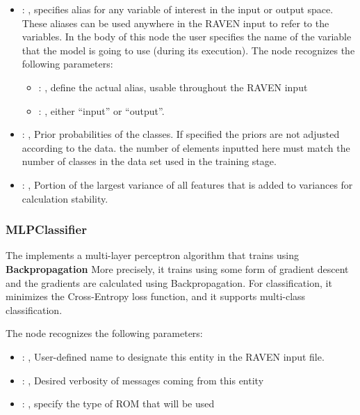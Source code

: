 \begin{itemize}
    \item {}: , 
      specifies alias for         any variable of interest in the input or output space. These
      aliases can be used anywhere in the RAVEN input to         refer to the variables. In the body
      of this node the user specifies the name of the variable that the model is going to use
      (during its execution).
      The  node recognizes the following parameters:
        \begin{itemize}
          \item {}: , 
            define the actual alias, usable throughout the RAVEN input
          \item {}: , 
            either ``input'' or ``output''.
      \end{itemize}

    \item {}: , 
      Prior probabilities of the classes. If specified the priors are
      not adjusted according to the data. \nb the number of elements inputted here must
      match the number of classes in the data set used in the training stage.

    \item {}: , 
      Portion of the largest variance of all features that is added to variances for
      calculation stability.
  \end{itemize}


\subsubsection{MLPClassifier}
  The  implements a multi-layer perceptron algorithm that trains using
  \textbf{Backpropagation}                             More precisely, it trains using some form of
  gradient descent and the gradients are calculated using Backpropagation.
  For classification, it minimizes the Cross-Entropy loss function, and it supports multi-class
  classification.                             

  The  node recognizes the following parameters:
    \begin{itemize}
      \item {}: , 
        User-defined name to designate this entity in the RAVEN input file.
      \item {}: , 
        Desired verbosity of messages coming from this entity
      \item {}: , 
        specify the type of ROM that will be used
  \end{itemize}


